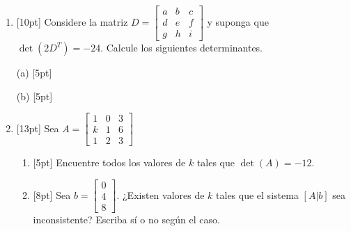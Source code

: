 \documentclass[11pt]{article}
\newcommand{\vf}{\fbox{V}\ \fbox{F}}
\newcommand{\sino}{\fbox{Sí}\ \fbox{No}}
\begin{document}
\begin{enumerate}
\begin{enumerate}
\vf
\end{enumerate}

\item{}[10pt] Considere la matriz $D = \begin{bmatrix}a & b & c\\ d & e & f\\ g & h & i\end{bmatrix}$ y suponga que $\det(2D^T) = -24$. Calcule los siguientes determinantes.

\vspace{6pt}
\noindent (a) [5pt]

\vspace{4pt}

\vspace{8pt}
\noindent (b) [5pt]

\vspace{4pt}

\item{}[13pt] Sea $A = \begin{bmatrix}1 & 0 & 3\\ k & 1 & 6\\ 1 & 2 & 3\end{bmatrix}$
\begin{enumerate}
\item{}[5pt] Encuentre todos los valores de $k$ tales que $\det(A) = -12$.

\vspace{2.5cm}

\item{}[8pt] Sea $b = \begin{bmatrix}0\\4\\8\end{bmatrix}$. ¿Existen valores de $k$ tales que el sistema $[A|b]$ sea inconsistente? Escriba sí o no según el caso.

\vspace{4pt}
\sino
\end{enumerate}


\end{enumerate}
\end{document}
